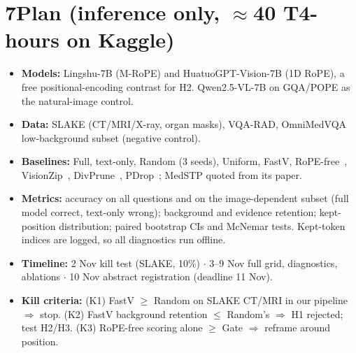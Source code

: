\documentclass[11pt]{article}
\begin{document}
\section*{7\quad Plan (inference only, $\approx$40 T4-hours on Kaggle)}
\begin{itemize}
  \item \textbf{Models:} Lingshu-7B (M-RoPE) and HuatuoGPT-Vision-7B (1D RoPE), a free
        positional-encoding contrast for H2. Qwen2.5-VL-7B on GQA/POPE as the natural-image
        control.
  \item \textbf{Data:} SLAKE (CT/MRI/X-ray, organ masks), VQA-RAD, OmniMedVQA low-background
        subset (negative control).
  \item \textbf{Baselines:} Full, text-only, Random (3 seeds), Uniform, FastV,
        RoPE-free~\cite{feather}, VisionZip~\cite{visionzip}, DivPrune~\cite{divprune},
        PDrop~\cite{pdrop}; MedSTP quoted from its paper.
  \item \textbf{Metrics:} accuracy on all questions and on the image-dependent subset (full model
        correct, text-only wrong); background and evidence retention; kept-position
        distribution; paired bootstrap CIs and McNemar tests. Kept-token indices are logged, so
        all diagnostics run offline.
  \item \textbf{Timeline:} 2 Nov kill test (SLAKE, 10\%) $\cdot$ 3--9 Nov full grid, diagnostics,
        ablations $\cdot$ 10 Nov abstract registration (deadline 11 Nov).
  \item \textbf{Kill criteria:} (K1) FastV $\ge$ Random on SLAKE CT/MRI in our pipeline
        $\Rightarrow$ stop. (K2) FastV background retention $\le$ Random's $\Rightarrow$ H1
        rejected; test H2/H3. (K3) RoPE-free scoring alone $\ge$ Gate $\Rightarrow$ reframe
        around position.
\end{itemize}
\end{document}
